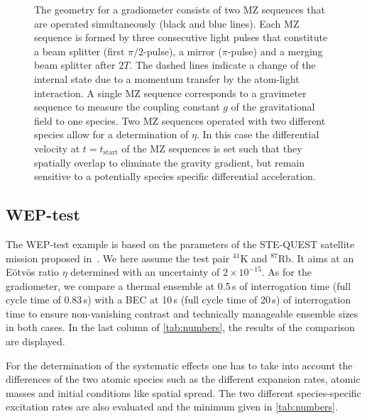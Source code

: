 \begin{figure}[h!]
    \centering
    
    \caption{The geometry for a gradiometer consists of two MZ sequences that are operated simultaneously (black and blue lines). Each MZ sequence is formed by three consecutive light pulses that constitute a beam splitter (first $\pi/2$-pulse), a mirror ($\pi$-pulse) and a merging beam splitter after $2T$. The dashed lines indicate a change of the internal state due to a momentum transfer by the atom-light interaction. 
    A single MZ sequence corresponds to a gravimeter sequence to measure the coupling constant $g$ of the gravitational field to one species.
    Two MZ sequences operated with two different species allow for a determination of $\eta$. In this case the differential velocity at $t=t_\text{start}$ of the MZ sequences is set such that they spatially overlap to eliminate the gravity gradient, but remain sensitive to a potentially species specific differential acceleration.}
    \label{fig:AI-geometry-scheme}
\end{figure}
%
\subsection{WEP-test}\label{sec:WEP-test}
The WEP-test example is based on the parameters of the STE-QUEST satellite mission proposed in~\cite{Aguilera2014}. We here assume the test pair $^{41}$K and $^{87}$Rb. It aims at an Eötvös ratio $\eta$ determined with an uncertainty of $2\times10^{-15}$. As for the gradiometer, we compare a thermal ensemble at 0.5\,s of interrogation time (full cycle time of 0.83\,s) with a BEC at 10\,s (full cycle time of 20\,s) of interrogation time to ensure non-vanishing contrast and technically manageable ensemble sizes in both cases. In the last column of \autoref{tab:numbers}, the results of the comparison are displayed.

For the determination of the systematic effects one has to take into account the differences of the two atomic species such as the different expansion rates, atomic masses and initial conditions like spatial spread. The two different species-specific excitation rates are also evaluated and the minimum given in \autoref{tab:numbers}.

